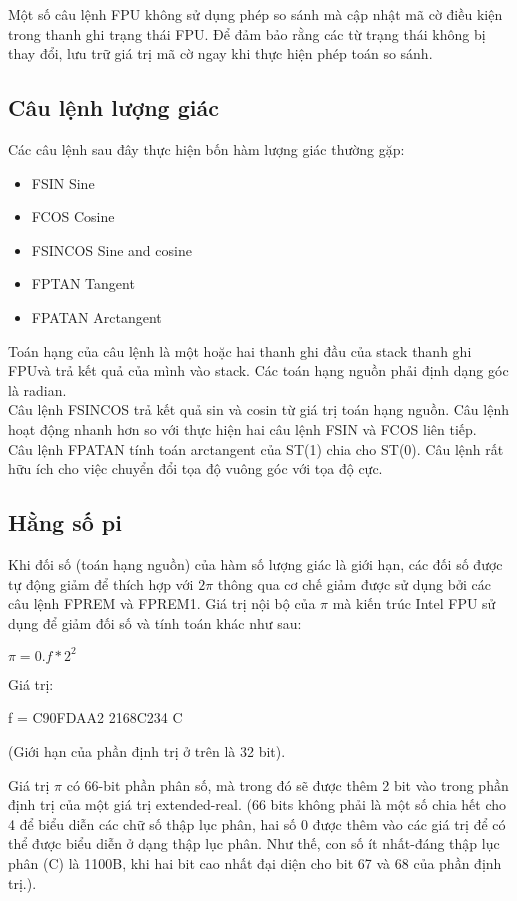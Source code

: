 		Một số câu lệnh FPU không sử dụng phép so sánh mà cập nhật mã cờ điều kiện trong thanh ghi trạng thái FPU. Để đảm bảo rằng các từ trạng thái không bị thay đổi, lưu trữ giá trị mã cờ ngay khi thực hiện phép toán so sánh.
		
			\subsection*{Câu lệnh lượng giác}
		Các câu lệnh sau đây thực hiện bốn hàm lượng giác thường gặp:
		\begin{itemize}
				\renewcommand{\labelitemi}{}
				\item	FSIN Sine
				\item	FCOS Cosine
				\item	FSINCOS Sine and cosine
				\item	FPTAN Tangent
				\item	FPATAN Arctangent
		\end{itemize}

		Toán hạng của câu lệnh là một hoặc hai thanh ghi đầu của stack thanh ghi FPUvà trả kết quả của mình vào stack. Các toán hạng nguồn phải định dạng góc là radian.\\
		
		Câu lệnh FSINCOS trả kết quả sin và cosin từ giá trị toán hạng nguồn. Câu lệnh hoạt động nhanh hơn so với thực hiện hai câu lệnh FSIN và FCOS liên tiếp.\\
		
		Câu lệnh FPATAN tính toán arctangent của ST(1) chia cho ST(0). Câu lệnh rất hữu ích cho việc chuyển đổi tọa độ vuông góc với tọa độ cực.

	\subsection*{Hằng số pi}
	Khi đối số (toán hạng nguồn) của hàm số lượng giác là giới hạn, các đối số được tự động giảm để thích hợp với $2\pi$ thông qua cơ chế giảm được sử dụng bởi các câu lệnh FPREM và FPREM1. Giá trị nội bộ của $\pi$ mà kiến trúc Intel FPU sử dụng để giảm đối số và tính toán khác như sau:
	
	
		$\pi = 0.f * 2^{2}$
		
		
		Giá trị:
		
		
		f = C90FDAA2 2168C234 C
		
		
		(Giới hạn của phần định trị ở trên là 32 bit).
		
		
		Giá trị  $\pi$ có 66-bit phần phân số, mà trong đó sẽ được thêm 2 bit vào trong phần định trị của một giá trị extended-real. (66 bits không phải là một số chia hết cho 4 để biểu diễn các chữ số thập lục phân, hai số 0 được thêm vào các giá trị để có thể được biểu diễn ở dạng thập lục phân. Như thế, con số ít nhất-đáng thập lục phân (C) là 1100B, khi hai bit cao nhất đại diện cho bit 67 và 68 của phần định trị.).\\
		
